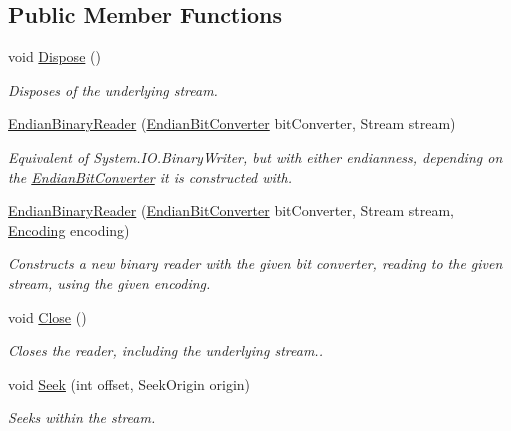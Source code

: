 \subsection*{Public Member Functions}
\begin{DoxyCompactItemize}
\item 
void \mbox{\hyperlink{class_t_net_1_1_i_o_1_1_endian_binary_reader_a9ef5db6cb6554c36fcd2bfb3aa5fc3ce}{Dispose}} ()
\begin{DoxyCompactList}\small\item\em Disposes of the underlying stream. \end{DoxyCompactList}\item 
\mbox{\hyperlink{class_t_net_1_1_i_o_1_1_endian_binary_reader_aafe4ad76a51e032b04cf5cb1571d90de}{Endian\+Binary\+Reader}} (\mbox{\hyperlink{class_t_net_1_1_i_o_1_1_endian_bit_converter}{Endian\+Bit\+Converter}} bit\+Converter, Stream stream)
\begin{DoxyCompactList}\small\item\em Equivalent of System.\+I\+O.\+Binary\+Writer, but with either endianness, depending on the \mbox{\hyperlink{class_t_net_1_1_i_o_1_1_endian_bit_converter}{Endian\+Bit\+Converter}} it is constructed with. \end{DoxyCompactList}\item 
\mbox{\hyperlink{class_t_net_1_1_i_o_1_1_endian_binary_reader_acd3b2751b1fe637b86604d533092ecc7}{Endian\+Binary\+Reader}} (\mbox{\hyperlink{class_t_net_1_1_i_o_1_1_endian_bit_converter}{Endian\+Bit\+Converter}} bit\+Converter, Stream stream, \mbox{\hyperlink{class_t_net_1_1_i_o_1_1_endian_binary_reader_acd6eb5fbc4f1ce36f7ba50c1b3fc2d8d}{Encoding}} encoding)
\begin{DoxyCompactList}\small\item\em Constructs a new binary reader with the given bit converter, reading to the given stream, using the given encoding. \end{DoxyCompactList}\item 
void \mbox{\hyperlink{class_t_net_1_1_i_o_1_1_endian_binary_reader_a151cf96c3448d97e8961a58a9f172524}{Close}} ()
\begin{DoxyCompactList}\small\item\em Closes the reader, including the underlying stream.. \end{DoxyCompactList}\item 
void \mbox{\hyperlink{class_t_net_1_1_i_o_1_1_endian_binary_reader_a3820798fc511f4ecedd0407461ffb359}{Seek}} (int offset, Seek\+Origin origin)
\begin{DoxyCompactList}\small\item\em Seeks within the stream. \end{DoxyCompactList}\item 

\end{DoxyCompactItemize}
